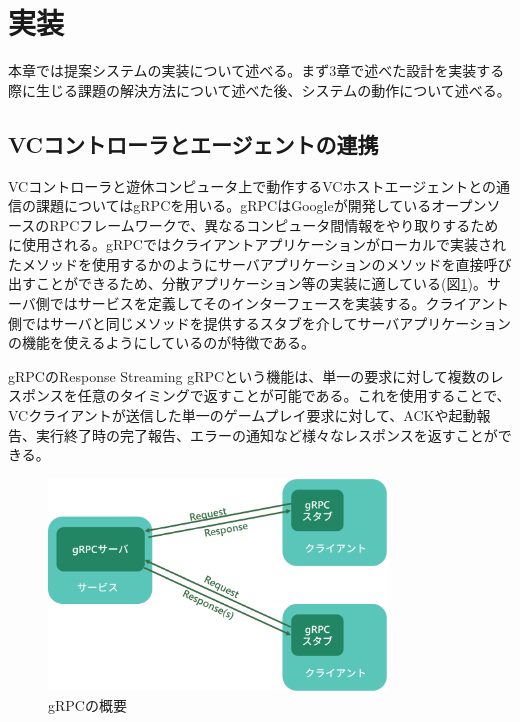 \section{実装}
本章では提案システムの実装について述べる。まず3章で述べた設計を実装する際に生じる課題の解決方法について述べた後、システムの動作について述べる。




\subsection{VCコントローラとエージェントの連携}
VCコントローラと遊休コンピュータ上で動作するVCホストエージェントとの通信の課題についてはgRPC\cite{grpc}を用いる。gRPCはGoogleが開発しているオープンソースのRPCフレームワークで、異なるコンピュータ間情報をやり取りするために使用される。gRPCではクライアントアプリケーションがローカルで実装されたメソッドを使用するかのようにサーバアプリケーションのメソッドを直接呼び出すことができるため、分散アプリケーション等の実装に適している(図\ref{fig:grpc})。サーバ側ではサービスを定義してそのインターフェースを実装する。クライアント側ではサーバと同じメソッドを提供するスタブを介してサーバアプリケーションの機能を使えるようにしているのが特徴である。

gRPCのResponse Streaming gRPCという機能は、単一の要求に対して複数のレスポンスを任意のタイミングで返すことが可能である。これを使用することで、VCクライアントが送信した単一のゲームプレイ要求に対して、ACKや起動報告、実行終了時の完了報告、エラーの通知など様々なレスポンスを返すことができる。

\begin{figure}[t]
    \centering
    \includegraphics[width=0.8\textwidth,keepaspectratio,clip]{img/grpc.eps}
    \caption{gRPCの概要}
    \label{fig:grpc}
\end{figure}

